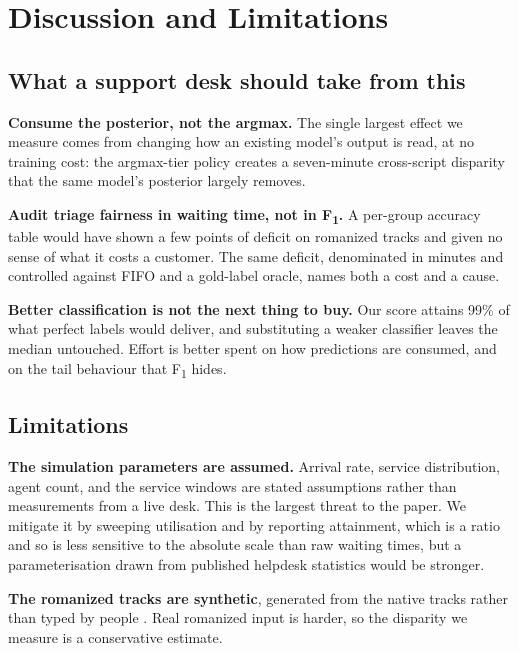 \section{Discussion and Limitations}
\label{sec:discussion}

\subsection{What a support desk should take from this}

\textbf{Consume the posterior, not the argmax.} The single largest effect we
measure comes from changing how an existing model's output is read, at no
training cost: the argmax-tier policy creates a seven-minute cross-script
disparity that the same model's posterior largely removes.

\textbf{Audit triage fairness in waiting time, not in F\textsubscript{1}.} A
per-group accuracy table would have shown a few points of deficit on romanized
tracks and given no sense of what it costs a customer. The same deficit,
denominated in minutes and controlled against FIFO and a gold-label oracle,
names both a cost and a cause.

\textbf{Better classification is not the next thing to buy.} Our score attains
99\% of what perfect labels would deliver, and substituting a weaker classifier
leaves the median untouched. Effort is better spent on how predictions are
consumed, and on the tail behaviour that F\textsubscript{1} hides.

\subsection{Limitations}

\textbf{The simulation parameters are assumed.} Arrival rate, service
distribution, agent count, and the service windows are stated assumptions rather
than measurements from a live desk. This is the largest threat to the paper. We
mitigate it by sweeping utilisation and by reporting attainment, which is a ratio
and so is less sensitive to the absolute scale than raw waiting times, but a
parameterisation drawn from published helpdesk statistics would be stronger.

\textbf{The romanized tracks are synthetic}, generated from the native tracks
rather than typed by people \cite{chakravarthi2020tamilmix}. Real romanized input
is harder, so the disparity we measure is a conservative estimate.

